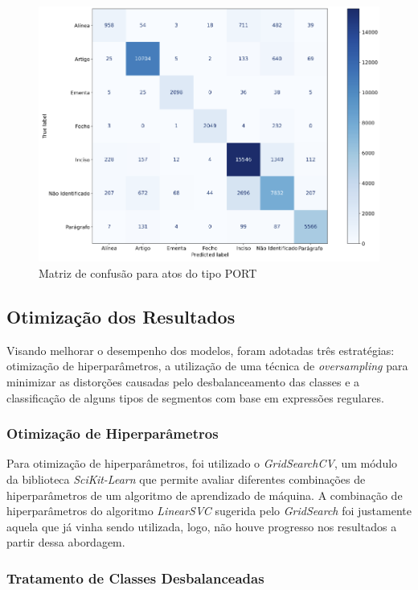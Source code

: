 \begin{figure}[h]
	\caption{Matriz de confusão para atos do tipo PORT}
	\center
	\label{fig:matriz-confusao-port}
	\includegraphics[scale=0.53]{resultados/matriz-confusao-port.png}
	\fdp
\end{figure}

\subsection{Otimização dos Resultados}

Visando melhorar o desempenho dos modelos, foram adotadas três estratégias: otimização de hiperparâmetros, a utilização de uma técnica de \textit{oversampling} para minimizar as distorções causadas pelo desbalanceamento das classes e a classificação de alguns tipos de segmentos com base em expressões regulares.

\subsubsection{Otimização de Hiperparâmetros}

Para otimização de hiperparâmetros, foi utilizado o \textit{GridSearchCV}, um módulo da biblioteca \textit{SciKit-Learn} que permite avaliar diferentes combinações de hiperparâmetros de um  algoritmo de aprendizado de máquina. A combinação de hiperparâmetros do algoritmo \textit{LinearSVC} sugerida pelo \textit{GridSearch} foi justamente aquela que já vinha sendo utilizada, logo, não houve progresso nos resultados a partir dessa abordagem.

\subsubsection{Tratamento de Classes Desbalanceadas}

